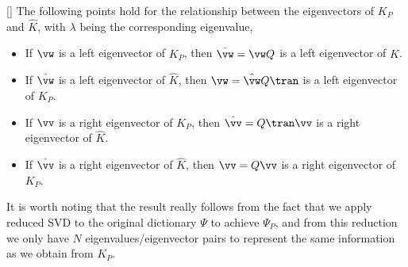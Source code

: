 \documentclass{article}
\begin{document}
\begin{proposition}\label{prop:khat_spectrum}[\citet{williams-2015b}]
        The following points hold for the relationship between the eigenvectors of \(K_P\) and \(\hat K\), with \(\lambda\) being the corresponding eigenvalue,
    \begin{itemize}
        \item If \(\vw\) is a left eigenvector of \(K_P\), then \(\hat \vw = \vw Q\) is a left eigenvector of \(\hat K\).
        \item If \(\hat \vw\) is a left eigenvector of \(\hat K\), then \(\vw = \hat \vw Q\tran \) is a left eigenvector of \(K_P\). 
        \item If \(\vv\) is a right eigenvector of \(K_P\), then \(\hat \vv = Q\tran \vv\) is a right eigenvector of \(\hat K\).
        \item If \(\hat \vv\) is a right eigenvector of \(\hat K\), then \(\vv = Q\vv\) is a right eigenvector of \(K_P\).
    \end{itemize}
\end{proposition}
It is worth noting that the result really follows from the fact that we apply reduced SVD to the original dictionary \(\Psi\) to achieve \(\Psi_P\), and from this reduction we only have \(N\) eigenvalues/eigenvector pairs to represent the same information as we obtain from \(K_P\).
\end{document}
